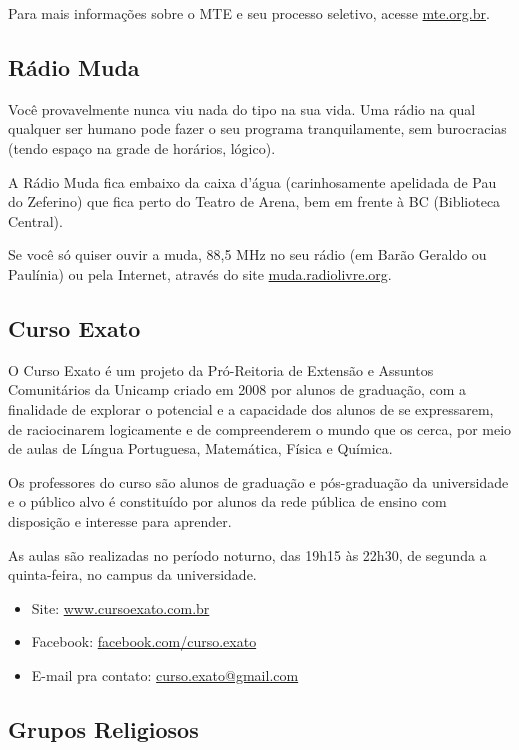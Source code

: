 Para mais informações sobre o MTE e seu processo seletivo, acesse
\url{mte.org.br}.

\subsection{Rádio Muda}

Você provavelmente nunca viu nada do tipo na sua vida. Uma rádio na qual
qualquer ser humano pode fazer o seu programa tranquilamente, sem burocracias
(tendo espaço na grade de horários, lógico).

A Rádio Muda fica embaixo da caixa d'água (carinhosamente apelidada de Pau do
Zeferino) que fica perto do Teatro de Arena, bem em frente à BC (Biblioteca
Central).

Se você só quiser ouvir a muda, 88,5 MHz no seu rádio (em Barão Geraldo ou
Paulínia) ou pela Internet, através do site \url{muda.radiolivre.org}.

\subsection{Curso Exato}

O Curso Exato é um projeto da Pró-Reitoria de Extensão e Assuntos Comunitários
da Unicamp criado em 2008 por alunos de graduação, com a finalidade de explorar
o potencial e a capacidade dos alunos de se expressarem, de raciocinarem
logicamente e de compreenderem o mundo que os cerca, por meio de aulas de Língua
Portuguesa, Matemática, Física e Química.

Os professores do curso são alunos de graduação e pós-graduação da universidade
e o público alvo é constituído por alunos da rede pública de ensino com
disposição e interesse para aprender.

As aulas são realizadas no período noturno, das 19h15 às 22h30, de segunda
a quinta-feira, no campus da universidade.

\begin{itemize}
\item Site: \url{www.cursoexato.com.br}
\item Facebook: \url{facebook.com/curso.exato}
\item E-mail pra contato: \url{curso.exato@gmail.com}
\end{itemize}

\subsection{Grupos Religiosos}

